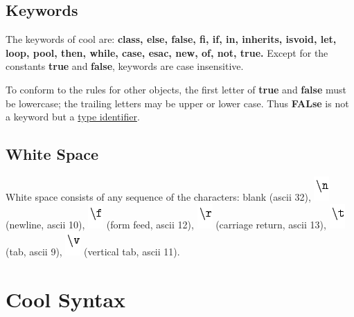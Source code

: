 \documentclass[]{article}
\begin{document}
\subsection{Keywords}

The keywords of cool are: \textbf{class, else, false, fi, if, in,
inherits, isvoid, let, loop, pool, then, while, case, esac, new, of,
not, true.} Except for the constants \textbf{true} and \textbf{false},
keywords are case insensitive.

To conform to the rules for other objects, the first letter of
\textbf{true} and \textbf{false} must be lowercase; the trailing letters
may be upper or lower case. Thus \textbf{FALse} is not a keyword but a
\href{node34.html}{type identifier}.

\subsection{White Space}

White space consists of any sequence of the characters: blank (ascii
32), \includegraphics{img38.png} (newline, ascii 10),
\includegraphics{img39.png} (form feed, ascii 12),
\includegraphics{img40.png} (carriage return, ascii 13),
\includegraphics{img41.png} (tab, ascii 9), \includegraphics{img42.png}
(vertical tab, ascii 11). \\

\section{Cool Syntax}
\end{document}
